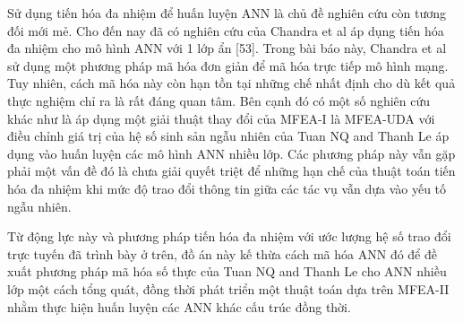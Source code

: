 Sử dụng tiến hóa đa nhiệm để huấn luyện ANN là chủ đề nghiên cứu còn tương đối mới mẻ. Cho đến nay đã có nghiên cứu của Chandra et al \cite{chandra2018evolutionary} áp dụng tiến hóa đa nhiệm cho mô hình ANN với 1 lớp ẩn [53]. Trong bài báo này, Chandra et al sử dụng một phương pháp mã hóa đơn giản để mã hóa trực tiếp mô hình mạng.
Tuy nhiên, cách mã hóa này còn hạn tồn tại những chế nhất định cho dù kết quả thực nghiệm chỉ ra là rất đáng quan tâm. Bên cạnh đó có một số nghiên cứu khác như là áp dụng một giải thuật thay đổi của MFEA-I là MFEA-UDA với điều chỉnh giá trị của hệ số sinh sản ngẫu nhiên của Tuan NQ and Thanh Le\cite{nqtuan} áp dụng vào huấn luyện các mô hình ANN nhiều lớp. Các phương pháp này vẫn gặp phải một vấn đề đó là chưa giải quyết triệt để những hạn chế của thuật toán tiến hóa đa nhiệm khi mức độ trao đổi thông tin giữa các tác vụ vẫn dựa vào yếu tố ngẫu nhiên. 

Từ động lực này và phương pháp tiến hóa đa nhiệm với ước lượng hệ số trao đổi trực tuyến đã trình bày ở trên, đồ án này kế thừa cách mã hóa ANN đó để đề xuất phương pháp mã hóa số thực của Tuan NQ and Thanh Le cho ANN nhiều lớp một cách tổng quát, đồng thời phát triển một thuật toán dựa trên MFEA-II nhằm thực hiện huấn luyện các ANN khác cấu trúc đồng thời.